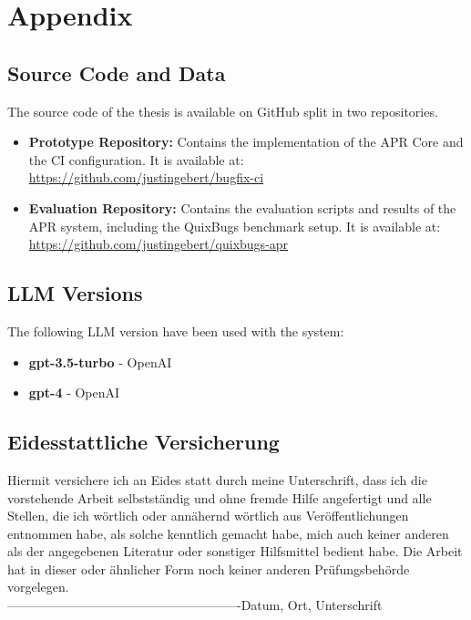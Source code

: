 \appendix

\chapter{Appendix} \label{chapter:appendix}

\section{Source Code and Data}
The source code of the thesis is available on GitHub split in two repositories.
\begin{itemize}
    \item \textbf{Prototype Repository:} Contains the implementation of the APR Core and the CI configuration. It is available at: \url{https://github.com/justingebert/bugfix-ci}
    \item \textbf{Evaluation Repository:} Contains the evaluation scripts and results of the APR system, including the QuixBugs benchmark setup. It is available at: \url{https://github.com/justingebert/quixbugs-apr}
\end{itemize}


\section{LLM Versions}
The following LLM version have been used with the system:
\begin{itemize}
    \item \textbf{gpt-3.5-turbo} - OpenAI
    \item \textbf{gpt-4} - OpenAI
\end{itemize}


\newpage



\thispagestyle{empty}
\noindent


\section*{Eidesstattliche Versicherung}
Hiermit versichere ich an Eides statt durch meine Unterschrift, dass ich die vorstehende Arbeit selbstst\"andig und ohne fremde Hilfe angefertigt und alle Stellen, die ich w\"ortlich oder ann\"ahernd w\"ortlich aus Ver\"offentlichungen entnommen habe, als solche kenntlich gemacht habe, mich auch keiner anderen als der angegebenen Literatur oder sonstiger Hilfsmittel bedient habe. Die Arbeit hat in dieser oder \"ahnlicher Form noch keiner anderen Pr\"ufungsbeh\"orde vorgelegen.\\
\linebreak[4]
\linebreak[4]
\linebreak[4]
\linebreak[4]
-------------------------------------------------------\linebreak[4]
Datum, Ort, Unterschrift